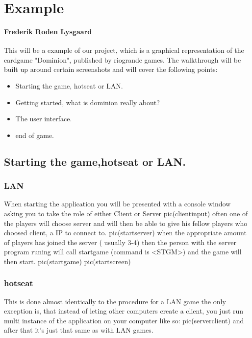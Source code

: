 \section{Example}
\paragraph{Frederik Roden Lysgaard}
This will be a example of our project, which is a graphical representation of the cardgame "Dominion", published by riogrande games.
The walkthrough will be built up around certain screenshots and will cover the following points:

\begin{itemize}
\item Starting the game, hotseat or LAN.
\item Getting started, what is dominion really about?
\item The user interface.
\item end of game.
\end{itemize}

\subsection{Starting the game,hotseat or LAN.}
\subsubsection{LAN}
When starting the application you will be presented with a console window asking you to take the role of either Client or Server
pic(clientinput)
often one of the players will choose server and will then be able to give his fellow players who choosed client, a IP to connect to.
pic(startserver)
when the appropriate amount of players has joined the server ( usually 3-4) then the person with the server program runing will
call startgame (command is <STGM>) and the game will then start.
pic(startgame)
pic(startscreen)

\subsubsection{hotseat}
This is done almost identically to the procedure for a LAN game the only exception is, that instead of leting other computers create a client, you just run multi instance of the application on your computer like so:
pic(serverclient)
and after that it's just that same as with LAN games.



